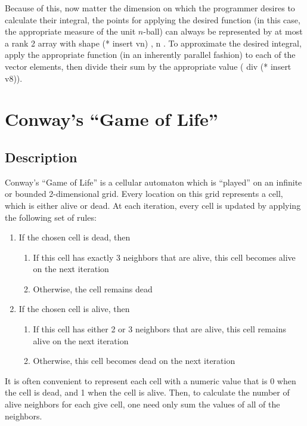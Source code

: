 Because of this, now matter the dimension on which the programmer desires to calculate their integral, 
the points for applying the desired function (in this case, the appropriate measure of the unit $n$-ball) 
can always be represented by at most a rank 2 array with shape \ttfamily (* insert vn) , n \normalfont.
To approximate the desired integral, apply the appropriate function (in an inherently parallel fashion) 
to each of the vector elements, then divide their sum by the appropriate value ( div (* insert v8)\normalfont).

\section{Conway's ``Game of Life''}
\subsection{Description}
Conway's ``Game of Life''\cite{gol} is a cellular automaton which is ``played'' on an infinite or bounded 2-dimensional grid. 
Every location on this grid represents a cell, which is either alive or dead. 
At each iteration, every cell is updated by applying the following set of rules:

\begin{enumerate}
	\item If the chosen cell is dead, then
	\begin{enumerate}
		\item If this cell has exactly 3 neighbors that are alive, 
			this cell becomes alive on the next iteration
		\item Otherwise, the cell remains dead
	\end{enumerate}
	\item If the chosen cell is alive, then
	\begin{enumerate}
		\item If this cell has either 2 or 3 neighbors that are alive, 
			this cell remains alive on the next iteration
		\item Otherwise, this cell becomes dead on the next iteration
	\end{enumerate}
\end{enumerate}

It is often convenient to represent each cell with a numeric value 
that is 0 when the cell is dead, and 1 when the cell is alive. 
Then, to calculate the number of alive neighbors for each give cell, 
one need only sum the values of all of the neighbors.

